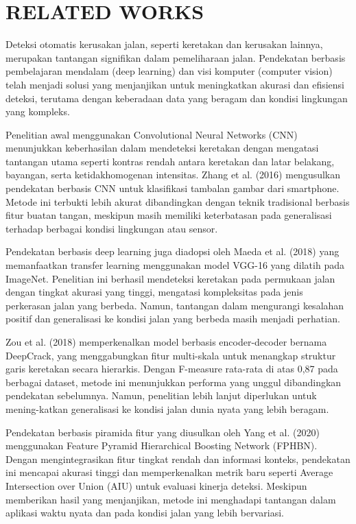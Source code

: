 \documentclass[12pt,a4paper]{article}
\begin{document}
\section{RELATED WORKS}
\begin{adjustwidth}{3em}{0pt} 
\hspace{0.5cm} Deteksi otomatis kerusakan jalan, seperti keretakan dan kerusakan lainnya, merupakan tantangan signifikan dalam pemeliharaan jalan. Pendekatan berbasis pembelajaran mendalam (deep learning) dan visi komputer (computer vision) telah menjadi solusi yang menjanjikan untuk meningkatkan akurasi dan efisiensi deteksi, terutama dengan keberadaan data yang beragam dan kondisi lingkungan yang kompleks.

\hspace{0.5cm} Penelitian awal menggunakan Convolutional Neural Networks (CNN) menunjukkan keberhasilan dalam mendeteksi keretakan dengan mengatasi tantangan utama seperti kontras rendah antara keretakan dan latar belakang, bayangan, serta ketidakhomogenan intensitas. Zhang et al. (2016) mengusulkan pendekatan berbasis CNN untuk klasifikasi tambalan gambar dari smartphone. Metode ini terbukti lebih akurat dibandingkan dengan teknik tradisional berbasis fitur buatan tangan, meskipun masih memiliki keterbatasan pada generalisasi terhadap berbagai kondisi lingkungan atau sensor.

\hspace{0.5cm} Pendekatan berbasis deep learning juga diadopsi oleh Maeda et al. (2018) yang memanfaatkan transfer learning menggunakan model VGG-16 yang dilatih pada ImageNet. Penelitian ini berhasil mendeteksi keretakan pada permukaan jalan dengan tingkat akurasi yang tinggi, mengatasi kompleksitas pada jenis perkerasan jalan yang berbeda. Namun, tantangan dalam mengurangi kesalahan positif dan generalisasi ke kondisi jalan yang berbeda masih menjadi perhatian.

\hspace{0.5cm} Zou et al. (2018) memperkenalkan model berbasis encoder-decoder bernama DeepCrack, yang menggabungkan fitur multi-skala untuk menangkap struktur garis keretakan secara hierarkis. Dengan F-measure rata-rata di atas 0,87 pada berbagai dataset, metode ini menunjukkan performa yang unggul dibandingkan pendekatan sebelumnya. Namun, penelitian lebih lanjut diperlukan untuk mening-katkan generalisasi ke kondisi jalan dunia nyata yang lebih beragam.

\hspace{0.5cm} Pendekatan berbasis piramida fitur yang diusulkan oleh Yang et al. (2020) menggunakan Feature Pyramid Hierarchical Boosting Network (FPHBN). Dengan mengintegrasikan fitur tingkat rendah dan informasi konteks, pendekatan ini mencapai akurasi tinggi dan memperkenalkan metrik baru seperti Average Intersection over Union (AIU) untuk evaluasi kinerja deteksi. Meskipun memberikan hasil yang menjanjikan, metode ini menghadapi tantangan dalam aplikasi waktu nyata dan pada kondisi jalan yang lebih bervariasi.


\end{adjustwidth}
\end{document}
